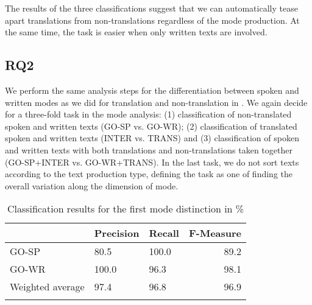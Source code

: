\documentclass[output=paper,colorlinks,citecolor=brown]{langscibook}
\begin{document}
The results of the three classifications %
suggest that we can automatically tease apart translations from non-translations  regardless of the mode production. At the same time, the task is easier when only written texts are involved.



\subsection{RQ2}\label{ssec:rq2}
We perform the same analysis steps for the differentiation between spoken and written modes as we did for translation and non-translation in . We again decide for a three-fold task in the mode analysis: (1) classification of non-translated spoken and written texts (GO-SP vs. GO-WR); (2) classification of translated spoken and written texts (INTER vs. TRANS) and (3) classification of spoken and written texts with both translations and non-translations taken together (GO-SP+INTER vs. GO-WR+TRANS). In the last task, we do not sort texts according to the text production type, defining the task as one of finding the overall variation along the dimension of mode.

\begin{table}[t]
    \begin{tabularx}{\textwidth}{XYYr}
\lsptoprule
 &\bf Precision & \bf Recall & \bf F-Measure\\
\midrule
GO-SP &   80.5 &   100.0  &   89.2    \\
GO-WR &   100.0 &  96.3  &  98.1   \\
Weighted average &  97.4 & 96.8  & 96.9  \\
\lspbottomrule
    \end{tabularx}
    \caption{Classification results for the first mode distinction in \%}
    \label{tab:rq2-1}
\end{table}
\end{document}
